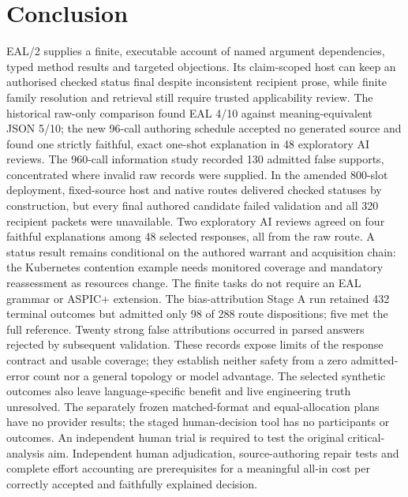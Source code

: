 \documentclass[preprint,12pt]{elsarticle}
\begin{document}
\section{Conclusion}\label{sec:conclusion}
EAL/2 supplies a finite, executable account of named argument dependencies, typed method results and targeted objections. Its claim-scoped host can keep an authorised checked status final despite inconsistent recipient prose, while finite family resolution and retrieval still require trusted applicability review. The historical raw-only comparison found EAL 4/10 against meaning-equivalent JSON 5/10; the new 96-call authoring schedule accepted no generated source and found one strictly faithful, exact one-shot explanation in 48 exploratory AI reviews. The 960-call information study recorded 130 admitted false supports, concentrated where invalid raw records were supplied. In the amended 800-slot deployment, fixed-source host and native routes delivered checked statuses by construction, but every final authored candidate failed validation and all 320 recipient packets were unavailable. Two exploratory AI reviews agreed on four faithful explanations among 48 selected responses, all from the raw route. A status result remains conditional on the authored warrant and acquisition chain: the Kubernetes contention example needs monitored coverage and mandatory reassessment as resources change. The finite tasks do not require an EAL grammar or ASPIC+ extension. The bias-attribution Stage A run retained 432 terminal outcomes but admitted only 98 of 288 route dispositions; five met the full reference. Twenty strong false attributions occurred in parsed answers rejected by subsequent validation. These records expose limits of the response contract and usable coverage; they establish neither safety from a zero admitted-error count nor a general topology or model advantage. The selected synthetic outcomes also leave language-specific benefit and live engineering truth unresolved. The separately frozen matched-format and equal-allocation plans have no provider results; the staged human-decision tool has no participants or outcomes. An independent human trial is required to test the original critical-analysis aim. Independent human adjudication, source-authoring repair tests and complete effort accounting are prerequisites for a meaningful all-in cost per correctly accepted and faithfully explained decision.
\end{document}
